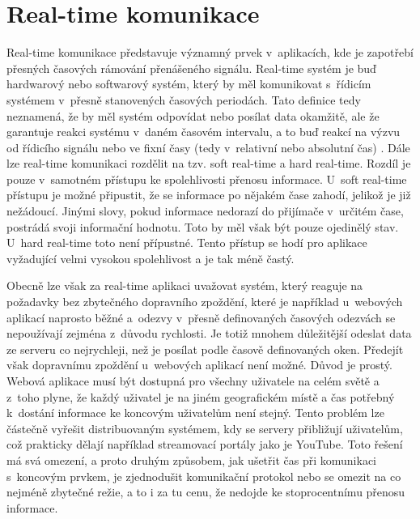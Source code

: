 \chapter{Real-time komunikace}
Real-time  komunikace představuje významný prvek v~aplikacích, kde je zapotřebí přesných časových rámování přenášeného signálu. Real-time systém je buď hardwarový nebo softwarový systém, který by měl komunikovat s~ří\-di\-cím systémem v~přesně stanovených časových periodách. Tato definice tedy neznamená, že by měl systém odpovídat nebo posílat data okamžitě, ale že garantuje reakci systému v~daném časovém intervalu, a to buď reakcí na výzvu od řídicího signálu nebo ve fixní časy (tedy v~relativní nebo absolutní čas) \cite{real-time}. Dále lze real-time komunikaci rozdělit na tzv. soft real-time a hard real-time. Rozdíl je pouze v~samotném přístupu ke spolehlivosti přenosu informace. U~soft real-time přístupu je možné připustit, že se informace po nějakém čase zahodí, jelikož je již nežádoucí. Jinými slovy, pokud informace nedorazí do přijímače v~určitém čase, postrádá svoji informační hodnotu. Toto by měl však být pouze ojedinělý stav. U~hard real-time toto není přípustné. Tento přístup se hodí pro aplikace vyžadující velmi vysokou spolehlivost a je tak méně častý.

Obecně lze však za real-time aplikaci uvažovat systém, který reaguje na požadavky bez zbytečného dopravního zpoždění, které je například u~we\-bo\-vých aplikací naprosto běžné a~odezvy v~přesně definovaných časových odezvách se nepoužívají zejména z~důvodu rychlosti. Je totiž mnohem dů\-le\-ži\-těj\-ší odeslat data ze serveru co nejrychleji, než je posílat podle časově definovaných oken. Předejít však dopravnímu zpoždění u~webových aplikací není možné. Důvod je prostý. Webová aplikace musí být dostupná pro všechny uživatele na celém světě a z~toho plyne, že každý uživatel je na jiném geografickém místě a čas potřebný k~dostání informace ke koncovým uživatelům není stejný. Tento problém lze částečně vyřešit distribuovaným systémem, kdy se servery přibližují uživatelům, což prakticky dělají například streamovací portály jako je YouTube. Toto řešení má svá omezení, a proto druhým způsobem, jak ušetřit čas při komunikaci s~koncovým prvkem, je zjednodušit komunikační protokol nebo se omezit na co nejméně zbytečné režie, a to i za tu cenu, že nedojde ke stoprocentnímu přenosu informace.

